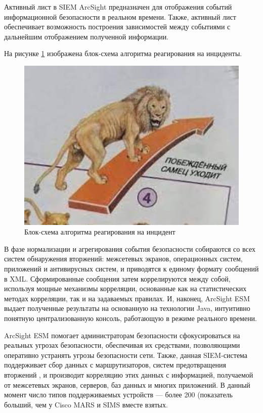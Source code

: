 Активный лист в SIEM ArcSight предназначен для отображения событий информационной безопасности в реальном времени. Также, активный лист обеспечивает возможность построения зависимостей между событиями с дальнейшим отображением полученной информации.

На рисунке \ref{alco} изображена блок-схема алгоритма реагирования на инциденты.
\begin{landscape}
\begin{figure}[H]
  \centering
  \includegraphics[width=1.5\textwidth]{resources/13.jpg}
  \caption{Блок-схема алгоритма реагирования на инцидент}
  \label{alco}
\end{figure}
\end{landscape}

В фазе нормализации и агрегирования события безопасности собираются со всех систем обнаружения вторжений: межсетевых экранов, операционных систем, приложений и антивирусных систем, и приводятся к единому формату сообщений в XML. Сформированные сообщения затем коррелируются между собой, используя мощные механизмы корреляции, основанные как на статистических методах корреляции, так и на задаваемых правилах. И, наконец, ArcSight ESM выдает полученные результаты на основанную на технологии Java, интуитивно понятную централизованную консоль, работающую в режиме реального времени.

ArcSight ESM помогает администраторам безопасности сфокусироваться на реальных угрозах безопасности, обеспечивая их средствами, позволяющими оперативно устранять угрозы безопасности сети. Также, данная SIEM-система поддерживает сбор данных с маршрутизаторов, систем предотвращения вторжений , и производит корреляцию этих данных с информацией, получаемой от межсетевых экранов, серверов, баз данных и многих приложений. В данный момент число типов поддерживаемых устройств --- более 200 (показатель больший, чем у Cisco MARS и SIMS вместе взятых.

